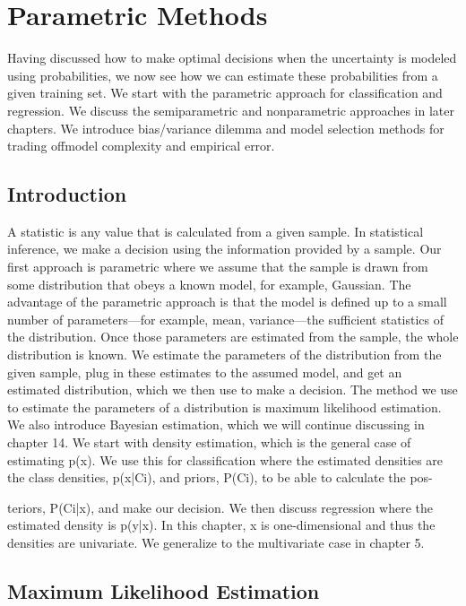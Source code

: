 \chapter{Parametric Methods}
\label{chap:04-parametric-methods}

Having discussed how to make optimal decisions when the uncertainty is modeled using probabilities, we now see how we can estimate these probabilities from a given training set. We start with the parametric approach for classification and regression. We discuss the semiparametric and nonparametric approaches in later chapters. We introduce bias/variance dilemma and model selection methods for trading offmodel complexity and empirical error.

\section{Introduction}

A statistic is any value that is calculated from a given sample. In statistical inference, we make a decision using the information provided by a sample. Our first approach is parametric where we assume that the sample is drawn from some distribution that obeys a known model, for example, Gaussian. The advantage of the parametric approach is that the model is defined up to a small number of parameters---for example, mean, variance---the sufficient statistics of the distribution. Once those parameters are estimated from the sample, the whole distribution is known. We estimate the parameters of the distribution from the given sample, plug in these estimates to the assumed model, and get an estimated distribution, which we then use to make a decision. The method we use to estimate the parameters of a distribution is maximum likelihood estimation. We also introduce Bayesian estimation, which we will continue discussing in chapter 14. We start with density estimation, which is the general case of estimating p(x). We use this for classification where the estimated densities are the class densities, p(x|Ci), and priors, P(Ci), to be able to calculate the pos-

teriors, P(Ci|x), and make our decision. We then discuss regression where the estimated density is p(y|x). In this chapter, x is one-dimensional and thus the densities are univariate. We generalize to the multivariate case in chapter 5.

\section{Maximum Likelihood Estimation}

